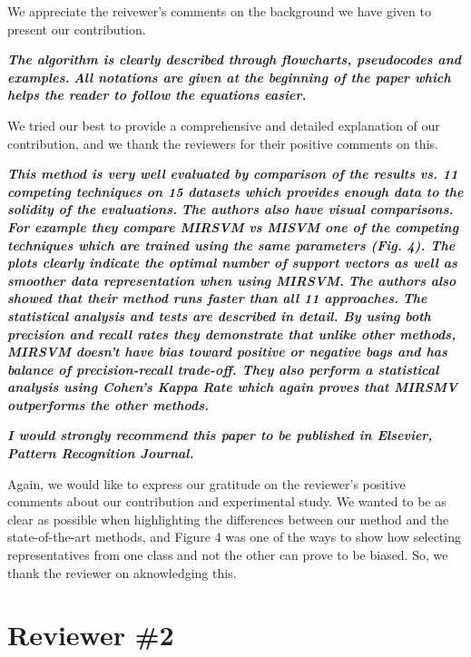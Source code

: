 \documentclass[a4paper,notitlepage]{article}
\begin{document}
\medskip

\noindent We appreciate the reivewer's comments on the background we have given to present our contribution. 

\noindent \textbf{\textit{The algorithm is clearly described through flowcharts, pseudocodes and examples.}}
\noindent \textbf{\textit{All notations are given at the beginning of the paper which helps the reader to follow the equations easier.}}

\medskip

\noindent We tried our best to provide a comprehensive and detailed explanation of our contribution, and we thank the reviewers for their positive comments on this. 

\noindent \textbf{\textit{This method is very well evaluated by comparison of the results vs. 11 competing techniques on 15  datasets which provides enough data to the solidity of the evaluations.}}
\noindent \textbf{\textit{The authors also have visual comparisons. For example they compare MIRSVM vs MISVM one of the competing techniques which are trained using the same parameters (Fig. 4). The plots clearly indicate the optimal number of support vectors as well as smoother data representation when using MIRSVM.}}
\noindent \textbf{\textit{The authors also showed that their method runs faster than all 11 approaches.}}
\noindent \textbf{\textit{The statistical analysis and tests are described in detail. By using both precision and recall rates they demonstrate that unlike other methods, MIRSVM doesn't have bias toward positive or negative bags and has balance of precision-recall trade-off. They also perform a statistical analysis using Cohen's Kappa Rate which again proves that MIRSMV outperforms the other methods.}}

\smallskip

\noindent  \textbf{\textit{I would strongly recommend this paper to be published in Elsevier, Pattern Recognition Journal.}}

\medskip

\noindent Again, we would like to express our gratitude on the reviewer's positive comments about our contribution and experimental study. We wanted to be as clear as possible when highlighting the differences between our method and the state-of-the-art methods, and Figure 4 was one of the ways to show how selecting representatives from one class and not the other can prove to be biased. So, we thank the reviewer on aknowledging this.

\section{Reviewer \#2}
\end{document}
